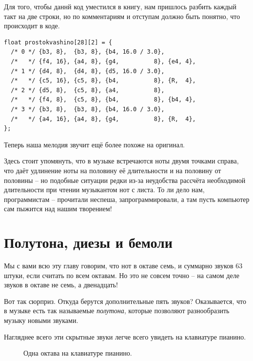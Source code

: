 \documentclass[a4paper,twoside]{book}
\newcommand{\note}[1]{
  \vspace{8pt}
  \begin{tabularx}{\textwidth}{m{1cm} m{9cm}}
    
    & \textbf{Примечание:} #1 \\
  \end{tabularx}
}
\begin{document}
Для того, чтобы даннй код уместился в книгу, нам пришлось разбить каждый такт на
две строки, но по комментариям и отступам должно быть понятно, что происходит в
коде.

\begin{verbatim}
float prostokvashino[28][2] = {
  /* 0 */ {b3, 8},  {b3, 8}, {b4, 16.0 / 3.0},
  /*   */ {f4, 16}, {a4, 8}, {g4,          8}, {e4, 4},
  /* 1 */ {d4, 8},  {d4, 8}, {d5, 16.0 / 3.0},
  /*   */ {c5, 16}, {c5, 8}, {b4,          8}, {R,  4},
  /* 2 */ {d5, 8},  {c5, 8}, {a4,          8},
  /*   */ {f4, 8},  {c5, 8}, {b4,          8}, {b4, 4},
  /* 3 */ {b3, 8},  {b3, 8}, {b4, 16.0 / 3.0},
  /*   */ {a4, 16}, {a4, 8}, {g4,          8}, {R,  4},
};
\end{verbatim}

Теперь наша мелодия звучит ещё более похоже на оригинал.

Здесь стоит упомянуть, что в музыке встречаются ноты двумя точками справа, что
даёт удлинение ноты на половину её длительности и на половину от половины -- но
подобные ситуации редки из-за неудобства рассчёта необходимой длительности при
чтении музыкантом нот с листа. То ли дело нам, программистам -- прочитали
неспеша, запрограммировали, а там пусть компьютер сам пыжится над нашим
творением!

\section{Полутона, диезы и бемоли}

Мы с вами всю эту главу говорим, что нот в октаве семь, и суммарно звуков 63
штуки, если считать по всем октавам. Но это не совсем точно -- на самом деле
звуков в октаве не семь, а двенадцать!

Вот так сюрприз. Откуда берутся дополнительные пять звуков? Оказывается, что в
музыке есть так называемые \emph{полутона}, которые позволяют разнообразить
музыку новыми звуками.

Нагляднее всего эти скрытные звуки легче всего увидеть на клавиатуре пианино.

\begin{figure}[ht]
  \caption{Одна октава на клавиатуре пианино.}
  \centering
  \label{fig:lilypond-music-graph-1}
\end{figure}
\end{document}
